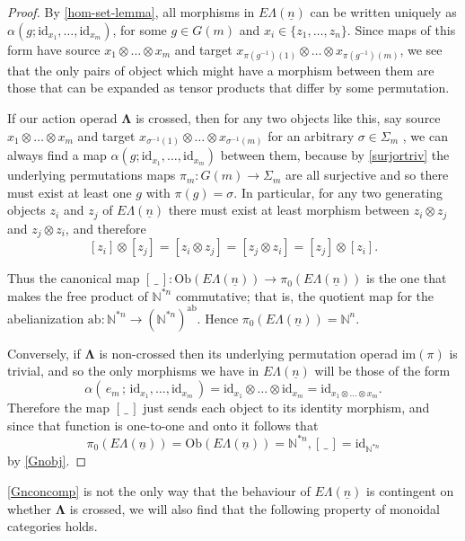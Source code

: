\documentclass{amsbook} %
\newcommand{\id}{\textrm{id}}
\newcommand{\ML}{\mathbf{\Lambda}}
\newcommand{\ELn}{E\Lambda(\underline{n})}
\numberwithin{section}{chapter}
\begin{document}
\begin{proof}
By \cref{hom-set-lemma}, all morphisms in $\ELn$ can be written uniquely as $\alpha(g; \id_{x_1}, \ldots, \id_{x_m})$, for some $g \in G(m)$ and $x_i \in \{z_1, \ldots, z_n \}$. Since maps of this form have source $x_1 \otimes \ldots \otimes x_m$ and target $x_{\pi(g^{-1})(1)} \otimes \ldots \otimes x_{\pi(g^{-1})(m)}$, we see that the only pairs of object which might have a morphism between them are those that can be expanded as tensor products that differ by some permutation. 


If our action operad $\ML$ is crossed, then for any two objects like this, say source $x_1 \otimes \ldots \otimes x_m$ and target $x_{\sigma^{-1}(1)} \otimes \ldots \otimes x_{\sigma^{-1}(m)}$ for an arbitrary $\sigma \in \Sigma_m$ , we can always find a map $\alpha(g; \id_{x_1}, \ldots, \id_{x_m})$ between them, because by \cref{surjortriv} the underlying permutations maps $\pi_m \colon  G(m) \to \Sigma_m$ are all surjective and so there must exist at least one $g$ with $\pi(g) = \sigma$. In particular, for any two generating objects $z_i$ and $z_j$ of $\ELn$ there must exist at least morphism between $z_i \otimes z_j$ and $z_j \otimes z_i$, and therefore
\[
  [z_i] \otimes [z_j] = [z_i \otimes z_j] = [z_j \otimes z_i] = [z_j] \otimes [z_i].
\]

Thus the canonical map $[ \, \_ \, ] \colon \mathrm{Ob}(\ELn) \to \pi_0(\ELn)$ is the one that makes the free product of $\mathbb{N}^{*n}$ commutative; that is, the quotient map for the abelianization $\mathrm{ab} \colon \mathbb{N}^{*n} \to (\mathbb{N}^{*n})^{\mathrm{ab}}$. Hence $\pi_0(\ELn) = \mathbb{N}^n$.

Conversely, if $\ML$ is non-crossed then its underlying permutation operad $\mathrm{im}(\pi)$ is trivial, and so the only morphisms we have in $\ELn$ will be those of the form
\[
  \alpha( \, e_m \, ; \, \id_{x_1}, \ldots, \id_{x_m} \, ) = \id_{x_1} \otimes \ldots \otimes \id_{x_m} = \id_{x_1 \otimes \ldots \otimes x_m}.
\]
Therefore the map $[ \, \_ \,]$ just sends each object to its identity morphism, and since that function is one-to-one and onto it follows that
\[
  \pi_0(\ELn) = \mathrm{Ob}(\ELn) = \mathbb{N}^{\ast n}, [ \, \_ \,] = \id_{\mathbb{N}^{*n}}
\]
by \cref{Gnobj}.
\end{proof}

\cref{Gnconcomp} is not the only way that the behaviour of $\ELn$ is contingent on whether $\ML$ is crossed, we will also find that the following property of monoidal categories holds.
\end{document}
